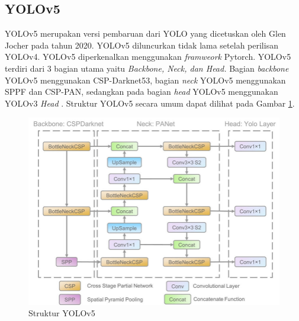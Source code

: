 \subsection{YOLOv5}
\label{subsec:yolov5}

YOLOv5 merupakan versi pembaruan dari YOLO yang dicetuskan oleh Glen Jocher pada tahun 2020. YOLOv5 diluncurkan tidak lama setelah perilisan YOLOv4. YOLOv5 diperkenalkan menggunakan \textit{framweork} Pytorch. YOLOv5 terdiri dari 3 bagian utama yaitu \textit{Backbone, Neck, \textnormal{dan} Head.} Bagian \textit{backbone} YOLOv5 menggunakan CSP-Darknet53, bagian \textit{neck} YOLOv5 menggunakan SPPF dan CSP-PAN, sedangkan pada bagian \textit{head} YOLOv5 menggunakan YOLOv3 \textit{Head} \citep*{ultralyticsyolo}. Struktur YOLOv5 secara umum dapat dilihat pada Gambar \ref{fig:strukturyolov5}. \par

\begin{figure}[H]
    \centering
    \includegraphics[scale=0.55]{gambar/yolov5.png}
    \caption{Struktur YOLOv5 \citep*{article}}
    \label{fig:strukturyolov5}
\end{figure}

